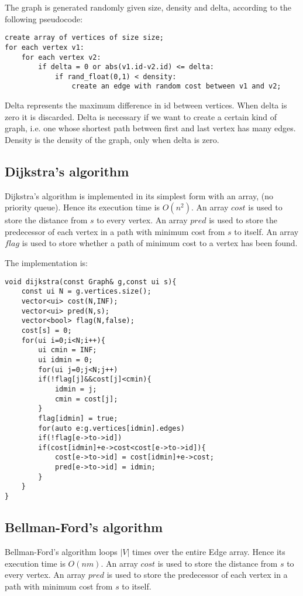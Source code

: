 The graph is generated randomly given size, density and delta, according to the following pseudocode:
\begin{verbatim}
create array of vertices of size size;
for each vertex v1:
    for each vertex v2:
        if delta = 0 or abs(v1.id-v2.id) <= delta:
            if rand_float(0,1) < density:
                create an edge with random cost between v1 and v2;
\end{verbatim}
Delta represents the maximum difference in id between vertices. When delta is zero it is discarded. Delta is necessary if we want to create a
certain kind of graph, i.e. one whose shortest path between first and last vertex has many edges. Density is the density of the graph, only when delta is zero.

\subsection{Dijkstra's algorithm}
Dijkstra's algorithm is implemented in its simplest form with an array, (no priority queue). Hence its execution time is $O(n^2)$.
An array $cost$ is used to store the distance from $s$ to every vertex.
An array $pred$ is used to store the predecessor of each vertex in a path with minimum cost from $s$ to itself.
An array $flag$ is used to store whether a path of minimum cost to a vertex has been found.

The implementation is:
\begin{verbatim}
void dijkstra(const Graph& g,const ui s){
	const ui N = g.vertices.size();
	vector<ui> cost(N,INF);
	vector<ui> pred(N,s);
	vector<bool> flag(N,false);
	cost[s] = 0;
	for(ui i=0;i<N;i++){
		ui cmin = INF;
		ui idmin = 0;
		for(ui j=0;j<N;j++)
		if(!flag[j]&&cost[j]<cmin){
			idmin = j;
			cmin = cost[j];
		}
		flag[idmin] = true;
		for(auto e:g.vertices[idmin].edges)
		if(!flag[e->to->id])
		if(cost[idmin]+e->cost<cost[e->to->id]){
			cost[e->to->id] = cost[idmin]+e->cost;
			pred[e->to->id] = idmin;
		}
	}
}
\end{verbatim}

\subsection{Bellman-Ford's algorithm}
Bellman-Ford's algorithm loops $|V|$ times over the entire Edge array. Hence its execution time is $O(nm)$.
An array $cost$ is used to store the distance from $s$ to every vertex.
An array $pred$ is used to store the predecessor of each vertex in a path with minimum cost from $s$ to itself.

